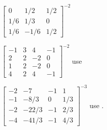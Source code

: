 \begin{exercise}
\begin{Parts}
\item \(\begin{bmatrix} 0&1/2&1/2
\\1/6&1/3&0
\\1/6&-1/6&1/2 \end{bmatrix}^{-2}\)

\item \(\begin{bmatrix} -1&3&4&-1
\\2&2&-2&0
\\1&2&-2&0
\\4&2&4&-1 \end{bmatrix}^{-2}\) use \script
{}

\begin{reduce}
\item \(\begin{bmatrix} -2&-7&-1&1
\\-1&-8/3&0&1/3
\\-2&-22/3&-1&2/3
\\-4&-41/3&-1&4/3 \end{bmatrix}^{-3}\) use \script.
\end{reduce}

\end{Parts}
\end{exercise}




